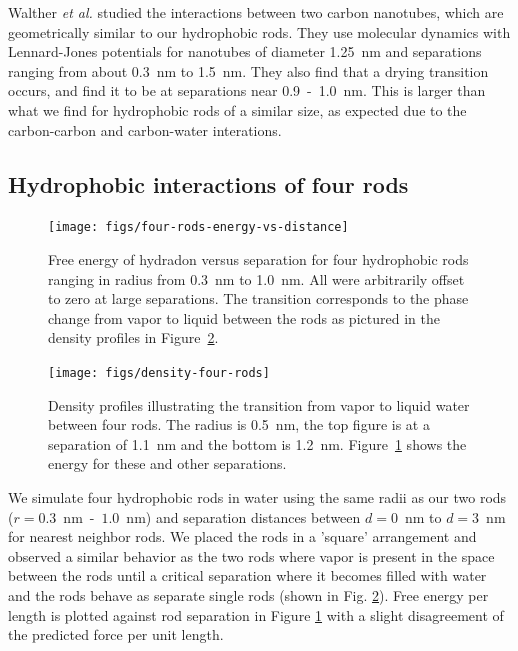 \documentclass[letterpaper,twocolumn,amsmath,amssymb,prb]{revtex4-1}
\begin{document}
Walther \emph{et al.}\cite{walther2004hydrodynamic} studied the interactions between two
carbon nanotubes, which are geometrically similar to our hydrophobic rods. 
They use molecular dynamics with Lennard-Jones potentials for
nanotubes of diameter 1.25~nm and separations ranging from about 0.3~nm to 1.5~nm.
They also find that a drying transition occurs, and find it to be at separations near
0.9~-~1.0~nm\cite{walther2004hydrodynamic}. This is larger than
what we find for hydrophobic rods of a similar size, as expected due to the carbon-carbon
and carbon-water interations.

\subsection{Hydrophobic interactions of four rods}

\begin{figure}
\begin{center}
\texttt{[image: figs/four-rods-energy-vs-distance]}
\end{center}
\caption{ Free energy of hydradon 
versus separation for four hydrophobic rods ranging in radius from
0.3~nm to 1.0~nm.
All were arbitrarily offset to zero at large separations. The
transition corresponds to the phase change from
vapor to liquid between the rods as pictured in the density profiles in 
Figure~\ref{fig:density-four-rods}. }
\label{fig:four-rods-energy-vs-distance}
\end{figure}

\begin{figure}
\begin{center}
\texttt{[image: figs/density-four-rods]}
\end{center}
\caption{ Density profiles illustrating the transition from vapor 
to liquid water between four rods. The radius is 0.5~nm, the top figure is 
at a separation of 1.1~nm and the
bottom is 1.2~nm. Figure~\ref{fig:four-rods-energy-vs-distance} shows
the energy for these and other separations.}

\label{fig:density-four-rods}
\end{figure}

We simulate four hydrophobic rods in water using the same radii as our
two rods ($r = 0.3$~nm~-~$1.0$~nm) and
separation distances between $d = 0$~nm to $d = 3$~nm for nearest neighbor rods. We placed
the rods in a 'square' arrangement and observed a similar behavior as the two rods
where vapor is present in the space between the rods until a critical separation
where it becomes filled with water and the rods behave as separate single rods
(shown in Fig. \ref{fig:density-four-rods}).  Free energy per length
is plotted against rod separation in Figure
\ref{fig:four-rods-energy-vs-distance} with a slight disagreement of
the predicted force per unit length.
\end{document}
